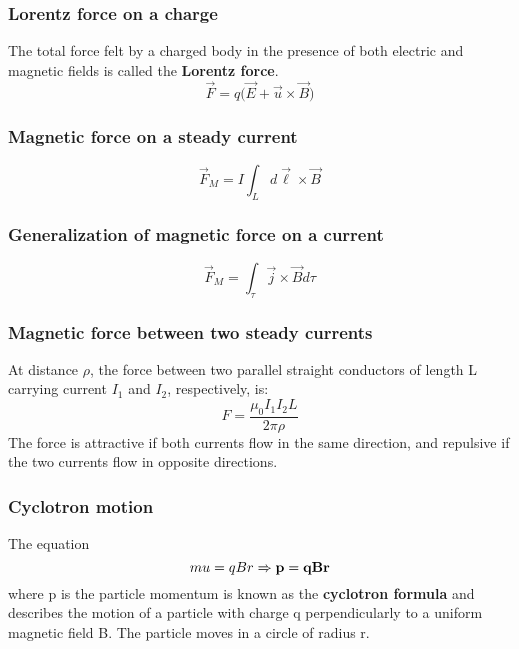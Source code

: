 \documentclass[english,11pt]{article}
\begin{document}
\subsubsection*{\bf Lorentz force on a charge}
The total force felt by a charged body in the presence of
both electric and magnetic fields is called the {\bf Lorentz force}.
\begin{equation*}
  \vec{F} = q \Big( \vec{E} + \vec{u} \times \vec{B} \Big)
\end{equation*}

\subsubsection*{\bf Magnetic force on a steady current}
\begin{equation*}
  \vec{F}_{M} = I \int_{L} d\vec{\ell} \times \vec{B}
\end{equation*}

\subsubsection*{\bf Generalization of magnetic force on a current}
\begin{equation*}
  \vec{F}_{M} =  \int_{\tau} \vec{j} \times \vec{B} d\tau
\end{equation*}


\subsubsection*{\bf Magnetic force between two steady currents}
At distance $\rho$, the force between two parallel straight
conductors of length L carrying current $I_1$ and $I_2$,
respectively, is:
\begin{equation*}
  F = \frac{\mu_0 I_{1} I_{2} L}{2\pi \rho}
\end{equation*}
The force is attractive if both currents flow in the same direction, and
repulsive if the two currents flow in opposite directions.

\subsubsection*{\bf Cyclotron motion}

The equation
\begin{equation*}
  m u = q B r \Rightarrow
  {\bf p = qBr}
\end{equation*}
where p is the particle momentum
is known as the {\bf cyclotron formula} and describes the motion of a particle with charge q
perpendicularly to a uniform magnetic field B.
The particle moves in a circle of radius r.\\
\end{document}
